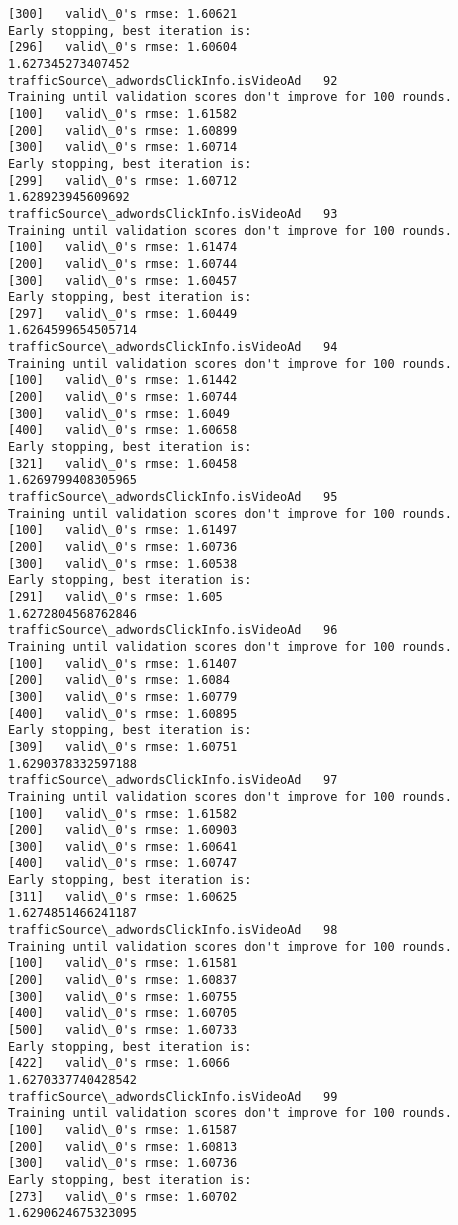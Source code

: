 \documentclass[11pt]{article}
\begin{document}
\begin{Verbatim}[commandchars=\\\{\}]
[300]	valid\_0's rmse: 1.60621
Early stopping, best iteration is:
[296]	valid\_0's rmse: 1.60604
1.627345273407452
trafficSource\_adwordsClickInfo.isVideoAd   92
Training until validation scores don't improve for 100 rounds.
[100]	valid\_0's rmse: 1.61582
[200]	valid\_0's rmse: 1.60899
[300]	valid\_0's rmse: 1.60714
Early stopping, best iteration is:
[299]	valid\_0's rmse: 1.60712
1.628923945609692
trafficSource\_adwordsClickInfo.isVideoAd   93
Training until validation scores don't improve for 100 rounds.
[100]	valid\_0's rmse: 1.61474
[200]	valid\_0's rmse: 1.60744
[300]	valid\_0's rmse: 1.60457
Early stopping, best iteration is:
[297]	valid\_0's rmse: 1.60449
1.6264599654505714
trafficSource\_adwordsClickInfo.isVideoAd   94
Training until validation scores don't improve for 100 rounds.
[100]	valid\_0's rmse: 1.61442
[200]	valid\_0's rmse: 1.60744
[300]	valid\_0's rmse: 1.6049
[400]	valid\_0's rmse: 1.60658
Early stopping, best iteration is:
[321]	valid\_0's rmse: 1.60458
1.6269799408305965
trafficSource\_adwordsClickInfo.isVideoAd   95
Training until validation scores don't improve for 100 rounds.
[100]	valid\_0's rmse: 1.61497
[200]	valid\_0's rmse: 1.60736
[300]	valid\_0's rmse: 1.60538
Early stopping, best iteration is:
[291]	valid\_0's rmse: 1.605
1.6272804568762846
trafficSource\_adwordsClickInfo.isVideoAd   96
Training until validation scores don't improve for 100 rounds.
[100]	valid\_0's rmse: 1.61407
[200]	valid\_0's rmse: 1.6084
[300]	valid\_0's rmse: 1.60779
[400]	valid\_0's rmse: 1.60895
Early stopping, best iteration is:
[309]	valid\_0's rmse: 1.60751
1.6290378332597188
trafficSource\_adwordsClickInfo.isVideoAd   97
Training until validation scores don't improve for 100 rounds.
[100]	valid\_0's rmse: 1.61582
[200]	valid\_0's rmse: 1.60903
[300]	valid\_0's rmse: 1.60641
[400]	valid\_0's rmse: 1.60747
Early stopping, best iteration is:
[311]	valid\_0's rmse: 1.60625
1.6274851466241187
trafficSource\_adwordsClickInfo.isVideoAd   98
Training until validation scores don't improve for 100 rounds.
[100]	valid\_0's rmse: 1.61581
[200]	valid\_0's rmse: 1.60837
[300]	valid\_0's rmse: 1.60755
[400]	valid\_0's rmse: 1.60705
[500]	valid\_0's rmse: 1.60733
Early stopping, best iteration is:
[422]	valid\_0's rmse: 1.6066
1.6270337740428542
trafficSource\_adwordsClickInfo.isVideoAd   99
Training until validation scores don't improve for 100 rounds.
[100]	valid\_0's rmse: 1.61587
[200]	valid\_0's rmse: 1.60813
[300]	valid\_0's rmse: 1.60736
Early stopping, best iteration is:
[273]	valid\_0's rmse: 1.60702
1.6290624675323095

    \end{Verbatim}
\end{document}
